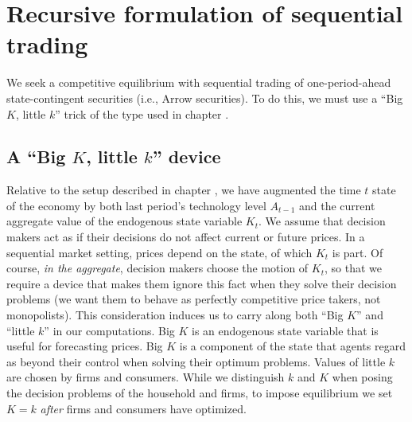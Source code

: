 \section{Recursive formulation of sequential trading}\label{sec:bigKlittlek}%
We seek a competitive equilibrium with sequential trading of
one-period-ahead state-contingent securities (i.e., Arrow securities).
To do this, we must use a ``Big $K$, little $k$'' trick of the type used in
chapter . %


\subsection{A ``Big $K$, little $k$'' device}
Relative to the setup described in chapter , we have
augmented the time $t$ state of the economy by both last period's
technology level $A_{t-1}$ and the current aggregate value of
the endogenous state variable $K_t$.  We assume that decision
makers act as if their decisions do not affect current or future prices. In a
sequential market setting, prices depend on the state, of which
$K_t$ is part. Of course, {\it in the aggregate\/}, decision
makers choose the motion of $K_t$, so that we  require a device
that makes them ignore this fact when they solve their decision
problems (we want them to behave as perfectly competitive price
takers, not monopolists). This consideration induces us to carry
along both ``Big $K$'' and ``little $k$'' in our computations.
Big $K$ is  an endogenous
state variable
that is useful for forecasting  prices.
Big $K$ is a component of the state that agents
regard as beyond their control when solving their optimum
problems. Values of little $k$ are chosen by firms and consumers.
While we distinguish $k$ and $K$
 when posing the decision problems of the household and firms,
to impose equilibrium we set $K=k$ {\it after\/} firms
and consumers have optimized.



